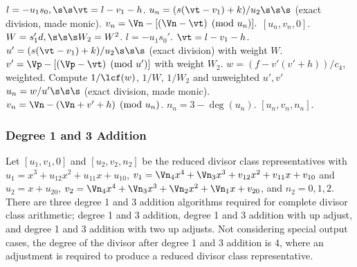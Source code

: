 \begin{algorithm}[H]
\begin{algorithmic} [1]
        \State $l = -u_1s_0, \s\s \vt = l - v_1 - h$.
        \State $u_n = (s(\vt - v_1) + k)/u_2 \s\s\s$ (exact division, made monic).
        \State $v_n = \Vn - [(\Vn - \vt) \pmod{u_n}].$
        \State \Return $[u_n,v_n,0]$.
    \EndIf
\EndIf
\State $W = s_1'd, \s\s\s W_2 = W^2$.
\State $l = -u_1s_0'$.
\State $\vt = l - v_1 - h$.
\State $u' = (s(\vt - v_1) + k)/u_2 \s\s\s$ (exact division) with weight $W$.
\State $v' = \Vp - [(\Vp - \vt) \pmod{u'}]$  with weight $W_2$.
\State $w = (f - v'(v' + h))/c_4$, weighted.
\State Compute $1/\lcf(w)$, $1/W$, $1/W_2$ and unweighted $u',v'$
\State $u_n = w/u' \s\s\s$ (exact division, made monic).
\State $v_n = \Vn - (\Vn + v' + h) \pmod{u_n}$.
\State $n_n = 3 - \deg(u_n)$.
\State \Return $[u_n,v_n,n_n]$.
\vspace{-2pt}
\end{algorithmic}
\end{algorithm}


\newpage



\subsubsection{Degree 1 and 3 Addition}
Let $[u_1,v_1,0]$ and $[u_2,v_2,n_2]$ be the reduced divisor class representatives
with $u_1 = x^3 + u_{12}x^2 + u_{11}x + u_{10}$, $v_1 = \Vn_4x^4 + \Vn_3x^3
+ v_{12}x^2 + v_{11}x + v_{10}$ and $u_2 = x + u_{20}$, $v_2 = \Vn_4x^4 +
\Vn_3x^3 + \Vn_2x^2 + \Vn_1x + v_{20}$, and $n_2 = 0,1,2$. There are three
degree 1 and 3 addition algorithms required for complete divisor class
arithmetic; degree 1 and 3 addition, degree 1 and 3 addition with up adjust, and
degree 1 and 3 addition with two up adjusts. Not considering special output
cases, the degree of the divisor after degree 1 and 3 addition is 4, where an
adjustment is required to produce a reduced divisor class representative.

